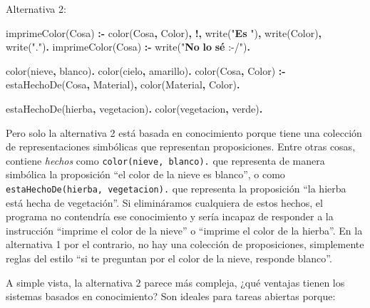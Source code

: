 \documentclass{tufte-handout}
\newenvironment{Shaded}{}{}
\newcommand{\KeywordTok}[1]{\textcolor[rgb]{0.00,0.44,0.13}{\textbf{{#1}}}}
\newcommand{\DataTypeTok}[1]{\textcolor[rgb]{0.56,0.13,0.00}{{#1}}}
\newcommand{\OtherTok}[1]{\textcolor[rgb]{0.00,0.44,0.13}{{#1}}}
\newcommand{\AlertTok}[1]{\textcolor[rgb]{1.00,0.00,0.00}{\textbf{{#1}}}}
\newcommand{\FunctionTok}[1]{\textcolor[rgb]{0.02,0.16,0.49}{{#1}}}
\newcommand{\ErrorTok}[1]{\textcolor[rgb]{1.00,0.00,0.00}{\textbf{{#1}}}}
\newcommand{\NormalTok}[1]{{#1}}
\begin{document}
Alternativa 2:

\begin{Shaded}
\begin{Highlighting}[]
\NormalTok{imprimeColor(}\DataTypeTok{Cosa}\NormalTok{) }\KeywordTok{:-} \NormalTok{color(}\DataTypeTok{Cosa}\KeywordTok{,} \DataTypeTok{Color}\NormalTok{)}\KeywordTok{,} \KeywordTok{!,} \FunctionTok{write}\NormalTok{(}\OtherTok{"}\ErrorTok{Es}\AlertTok{ }\OtherTok{"}\NormalTok{)}\KeywordTok{,} \FunctionTok{write}\NormalTok{(}\DataTypeTok{Color}\NormalTok{)}\KeywordTok{,} \FunctionTok{write}\NormalTok{(}\OtherTok{"."}\NormalTok{)}\KeywordTok{.}
\NormalTok{imprimeColor(}\DataTypeTok{Cosa}\NormalTok{) }\KeywordTok{:-} \FunctionTok{write}\NormalTok{(}\OtherTok{"}\ErrorTok{No}\AlertTok{ }\ErrorTok{lo}\AlertTok{ }\ErrorTok{sé}\AlertTok{ }\OtherTok{:-/"}\NormalTok{)}\KeywordTok{.}

\NormalTok{color(nieve}\KeywordTok{,} \NormalTok{blanco)}\KeywordTok{.}
\NormalTok{color(cielo}\KeywordTok{,} \NormalTok{amarillo)}\KeywordTok{.}
\NormalTok{color(}\DataTypeTok{Cosa}\KeywordTok{,} \DataTypeTok{Color}\NormalTok{) }\KeywordTok{:-} \NormalTok{estaHechoDe(}\DataTypeTok{Cosa}\KeywordTok{,} \DataTypeTok{Material}\NormalTok{)}\KeywordTok{,} \NormalTok{color(}\DataTypeTok{Material}\KeywordTok{,} \DataTypeTok{Color}\NormalTok{)}\KeywordTok{.}

\NormalTok{estaHechoDe(hierba}\KeywordTok{,} \NormalTok{vegetacion)}\KeywordTok{.}
\NormalTok{color(vegetacion}\KeywordTok{,} \NormalTok{verde)}\KeywordTok{.}
\end{Highlighting}
\end{Shaded}

Pero solo la alternativa 2 está basada en conocimiento porque tiene una
colección de representaciones simbólicas que representan proposiciones.
Entre otras cosas, contiene \emph{hechos} como
\texttt{color(nieve, blanco).} que representa de manera simbólica la
proposición ``el color de la nieve es blanco'', o como
\texttt{estaHechoDe(hierba, vegetacion).} que representa la proposición
``la hierba está hecha de vegetación''. Si elimináramos cualquiera de
estos hechos, el programa no contendría ese conocimiento y sería incapaz
de responder a la instrucción ``imprime el color de la nieve'' o
``imprime el color de la hierba''. En la alternativa 1 por el contrario,
no hay una colección de proposiciones, simplemente reglas del estilo
``si te preguntan por el color de la nieve, responde blanco''.

A simple vista, la alternativa 2 parece más compleja, ¿qué ventajas
tienen los sistemas basados en conocimiento? Son ideales para tareas
abiertas porque:
\end{document}

